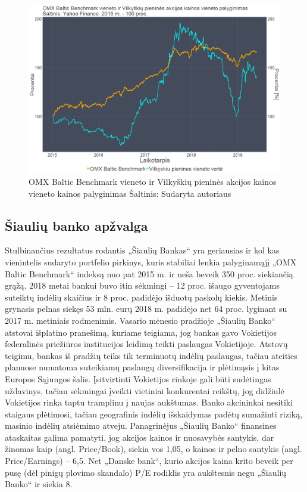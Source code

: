 \documentclass[12pt]{article}
\begin{document}
\begin{figure}[H]
\captionsetup{justification=centering}
\center
\includegraphics[scale=0.4]{VLP.png}
\caption{OMX Baltic Benchmark vieneto ir Vilkyškių pieninės akcijos kainos vieneto kainos palyginimas \newline
Šaltinis: Sudaryta autoriaus}
\end{figure}

\subsection{Šiaulių banko apžvalga}

Stulbinančius rezultatus rodantis „Šiaulių Bankas“ yra geriausias ir kol kas vienintelis sudaryto portfelio pirkinys, kuris stabiliai lenkia palyginamąjį „OMX Baltic Benchmark“ indeksą nuo pat 2015 m. ir neša beveik 350 proc. siekiančią grąžą. 2018 metai bankui buvo itin sėkmingi – 12 proc. išaugo gyventojams suteiktų indėlių skaičius ir 8 proc. padidėjo išduotų paskolų kiekis. Metinis grynasis pelnas siekęs 53 mln. eurų 2018 m. padidėjo net 64 proc. lyginant su 2017 m. metiniais rodmenimis. Vasario mėnesio pradžioje „Šiaulių Banko“ atstovai išplatino pranešimą, kuriame teigiama, jog bankas gavo Vokietijos federalinės priežiūros institucijos leidimą teikti paslaugas Vokietijoje. Atstovų teigimu, bankas iš pradžių teiks tik terminuotų indėlių paslaugas, tačiau ateities planuose numatoma suteikiamų paslaugų diversifikacija ir plėtimąsis į kitas Europos Sąjungos šalis. Įsitvirtinti Vokietijos rinkoje gali būti sudėtingas uždavinys, tačiau sėkmingai įveikti vietiniai konkurentai reikštų, jog didžiulė Vokietijos rinka taptu tramplinu į naujas aukštumas. Banko akcininkai nesitiki staigaus plėtimosi, tačiau geografinis indėlių išskaidymas padėtų sumažinti riziką, masinio indėlių atsiėmimo atveju. Panagrinėjus „Šiaulių Banko“ finansines ataskaitas galima pamatyti, jog akcijos kainos ir nuosavybės santykis, dar žinomas kaip (angl. Price/Book), siekia vos 1,05, o kainos ir pelno santykis (angl. Price/Earnings) – 6,5. Net „Danske bank“, kurio akcijos kaina krito beveik per pusę (dėl pinigų plovimo skandalo) P/E rodiklis yra aukštesnis negu „Šiaulių Banko“ ir siekia 8. 
\end{document}
